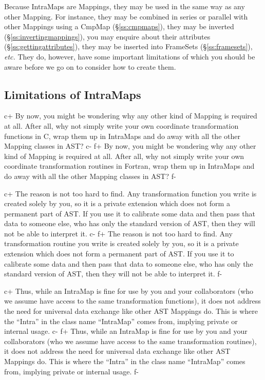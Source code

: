 \documentclass[twoside,11pt]{starlink}
\providecommand{\secref}[1]{\S\ref{#1}}
\begin{document}
Because IntraMaps are Mappings, they may be used in the same way as
any other Mapping. For instance, they may be combined in series or
parallel with other Mappings using a CmpMap (\secref{ss:cmpmaps}),
they may be inverted (\secref{ss:invertingmappings}), you may enquire
about their attributes (\secref{ss:gettingattributes}), they may be
inserted into FrameSets (\secref{ss:framesets}), \emph{etc.} They do,
however, have some important limitations of which you should be aware
before we go on to consider how to create them.

\subsection{\label{ss:intramaplimitations}Limitations of IntraMaps}

c+
By now, you might be wondering why any other kind of Mapping is
required at all. After all, why not simply write your own coordinate
transformation functions in C, wrap them up in IntraMaps and do away
with all the other Mapping classes in AST?
c-
f+
By now, you might be wondering why any other kind of Mapping is
required at all. After all, why not simply write your own coordinate
transformation routines in Fortran, wrap them up in IntraMaps and do
away with all the other Mapping classes in AST?
f-

c+
The reason is not too hard to find. Any transformation function you
write is created solely by you, so it is a private extension which
does not form a permanent part of AST. If you use it to calibrate some
data and then pass that data to someone else, who has only the
standard version of AST, then they will not be able to interpret it.
c-
f+
The reason is not too hard to find. Any transformation routine you
write is created solely by you, so it is a private extension which
does not form a permanent part of AST. If you use it to calibrate some
data and then pass that data to someone else, who has only the
standard version of AST, then they will not be able to interpret it.
f-

c+
Thus, while an IntraMap is fine for use by you and your collaborators
(who we assume have access to the same transformation functions), it
does not address the need for universal data exchange like other AST
Mappings do. This is where the ``Intra'' in the class name
``IntraMap'' comes from, implying private or internal usage.
c-
f+
Thus, while an IntraMap is fine for use by you and your collaborators
(who we assume have access to the same transformation routines), it
does not address the need for universal data exchange like other AST
Mappings do. This is where the ``Intra'' in the class name
``IntraMap'' comes from, implying private or internal usage.
f-
\end{document}

